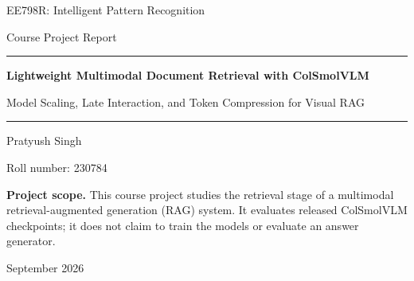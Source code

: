 \documentclass[11pt,a4paper]{article}
\begin{document}
\begin{titlepage}
\centering
\vspace*{1.6cm}
{\Large EE798R: Intelligent Pattern Recognition\par}
\vspace{0.25cm}
{\large Course Project Report\par}
\vspace{1.3cm}
{\color{navy}\rule{\textwidth}{1.4pt}\par}
\vspace{0.7cm}
{\Huge\bfseries Lightweight Multimodal Document Retrieval with ColSmolVLM\par}
\vspace{0.35cm}
{\Large Model Scaling, Late Interaction, and Token Compression for Visual RAG\par}
\vspace{0.7cm}
{\color{navy}\rule{\textwidth}{1.4pt}\par}
\vspace{1.5cm}
{\Large Pratyush Singh\par}
\vspace{0.2cm}
{\large Roll number: 230784\par}
\vfill
\begin{minipage}{0.82\textwidth}
\small
\textbf{Project scope.} This course project studies the retrieval stage of a multimodal retrieval-augmented generation (RAG) system. It evaluates released ColSmolVLM checkpoints; it does not claim to train the models or evaluate an answer generator.
\end{minipage}
\vfill
{\large September 2026\par}
\end{titlepage}

\begin{abstract}
A retrieval-augmented generation system can answer from a document only after it finds the page containing the evidence. This is difficult for visually rich PDFs because meaning may be carried by a table layout, a plot, a logo, or the position of a small label---not only by plain text. This course project studies that retrieval problem step by step. It compares two OCR-based text methods, a visual method that reduces a whole page to one vector, and a visual method that keeps many local page vectors and matches them using MaxSim. The experiments use the complete DocVQA, InfoVQA, ArxivQA, and TatDQA retrieval test sets. The 500M MaxSim model obtains nDCG@5 scores of 57.8, 86.9, 74.7, and 76.5, respectively, and is the best tested method on every dataset. The project also studies efficiency: k-means compression keeps at least 95\% of the original retrieval quality while storing only 12.5--25\% of the page tokens. The report explains the underlying mathematics with small examples, connects each equation to the implementation, and discusses where the system succeeds, where it fails, and what would still be needed to turn the retriever into a complete multimodal RAG application.
\end{abstract}
\end{document}
